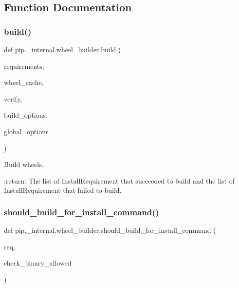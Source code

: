 \subsection{Function Documentation}
\mbox{\label{namespacepip_1_1__internal_1_1wheel__builder_a413cbabbf4b550b880022d07be8a3df7}} 
\subsubsection{\texorpdfstring{build()}{build()}}
{\footnotesize\ttfamily def pip.\+\_\+internal.\+wheel\+\_\+builder.\+build (\begin{DoxyParamCaption}\item[{}]{requirements,  }\item[{}]{wheel\+\_\+cache,  }\item[{}]{verify,  }\item[{}]{build\+\_\+options,  }\item[{}]{global\+\_\+options }\end{DoxyParamCaption})}

\begin{DoxyVerb}Build wheels.

:return: The list of InstallRequirement that succeeded to build and
    the list of InstallRequirement that failed to build.
\end{DoxyVerb}
 \mbox{\label{namespacepip_1_1__internal_1_1wheel__builder_ab94686847ec6405ad386cc08d1c330f5}} 
\subsubsection{\texorpdfstring{should\+\_\+build\+\_\+for\+\_\+install\+\_\+command()}{should\_build\_for\_install\_command()}}
{\footnotesize\ttfamily def pip.\+\_\+internal.\+wheel\+\_\+builder.\+should\+\_\+build\+\_\+for\+\_\+install\+\_\+command (\begin{DoxyParamCaption}\item[{}]{req,  }\item[{}]{check\+\_\+binary\+\_\+allowed }\end{DoxyParamCaption})}

